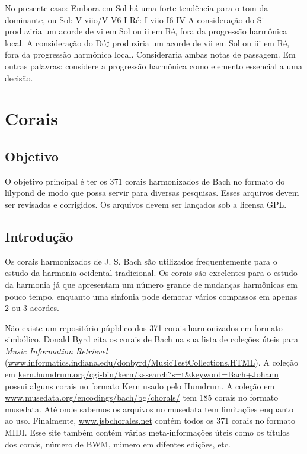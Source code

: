 \documentclass[12pt,brazil]{book}
\begin{document}
No presente caso:                                                                                    
Embora em Sol há uma forte tendência para o tom da dominante, ou                                     
        Sol: V viio/V V6 I                                                                           
        Ré:  I viio   I6 IV                                                                          
A consideração do Si produziria um acorde de vi em Sol ou ii em Ré, fora da progressão harmônica     
local.                                                                                              
A consideração do Dó$\sharp$ produziria um acorde de vii em Sol ou iii em Ré, fora da progressão harmônica  
local.                                                                                              
Consideraria ambas notas de passagem.                                                                
Em outras palavras: considere a progressão harmônica como elemento essencial a uma decisão.          

\chapter{Corais}
\label{chap:corais}

\section{Objetivo}
\label{sec:objetivo}

O objetivo principal é ter os 371 corais harmonizados de Bach no
formato do lilypond de modo que possa servir para diversas pesquisas.
Esses arquivos devem ser revisados e corrigidos. Os arquivos devem ser
lançados sob a licensa GPL.

\section{Introdução}
\label{sec:introducao}

Os corais harmonizados de J. S. Bach são utilizados frequentemente
para o estudo da harmonia ocidental tradicional. Os corais são
excelentes para o estudo da harmonia já que apresentam um número
grande de mudanças harmônicas em pouco tempo, enquanto uma sinfonia
pode demorar vários compassos em apenas 2 ou 3 acordes.

Não existe um repositório púpblico dos 371 corais harmonizados em
formato simbólico. Donald Byrd cita os corais de Bach na sua lista de
coleções úteis para \textit{Music Information Retrievel}
(\url{www.informatics.indiana.edu/donbyrd/MusicTestCollections.HTML}).
A coleção em
\url{kern.humdrum.org/cgi-bin/kern/kssearch?s=t&keyword=Bach+Johann}
possui alguns corais no formato Kern usado pelo Humdrum. A coleção em
\url{www.musedata.org/encodings/bach/bg/chorals/} tem 185 corais no
formato musedata. Até onde sabemos os arquivos no musedata tem
limitações enquanto ao uso. Finalmente, \url{www.jsbchorales.net}
contém todos os 371 corais no formato MIDI. Esse site também contém
várias meta-informações úteis como os títulos dos corais, número de
BWM, número em difentes edições, etc.
\end{document}
